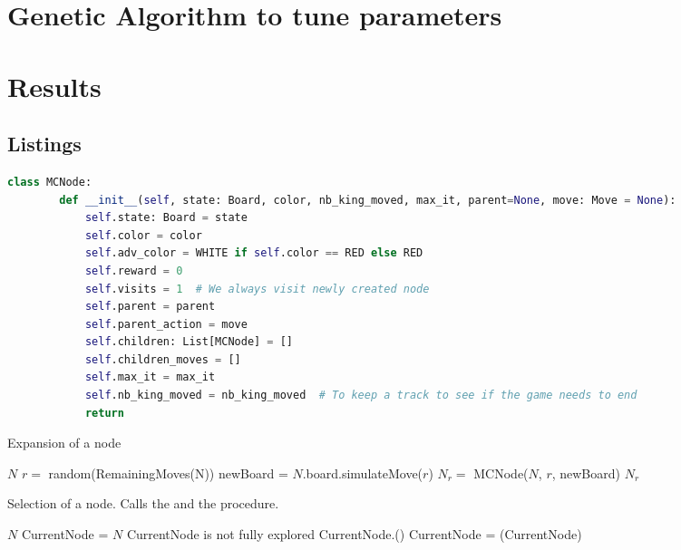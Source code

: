 \documentclass[11pt,a4paper]{article}
\begin{document}
\section{Genetic Algorithm to tune parameters}

\section{Results}

\begin{appendices}
\section{Listings}
\begin{lstlisting}[language=python, label=listing:constructor, caption={Constructor of a Monte-Carlo Tree-Search Node}]
    class MCNode:
        def __init__(self, state: Board, color, nb_king_moved, max_it, parent=None, move: Move = None):
            self.state: Board = state
            self.color = color
            self.adv_color = WHITE if self.color == RED else RED
            self.reward = 0
            self.visits = 1  # We always visit newly created node
            self.parent = parent
            self.parent_action = move
            self.children: List[MCNode] = []
            self.children_moves = []
            self.max_it = max_it
            self.nb_king_moved = nb_king_moved  # To keep a track to see if the game needs to end
            return
    \end{lstlisting}

\begin{algorithm}
    \caption{Expansion of a node}\label{listing:expand}
    \begin{algorithmic}
    \State $N$
    \State $r = $ random(RemainingMoves(N))
    \State newBoard = $N$.board.simulateMove($r$)
    \State $N_r = $ MCNode($N$, $r$, newBoard)
    \State \Return $N_r$
    \EndProcedure
    \end{algorithmic}
\end{algorithm}

\begin{algorithm}
    \caption{Selection of a node. Calls the  and the  procedure.}\label{listing:selection}
    \begin{algorithmic}
    \State $N$
    \State CurrentNode = $N$ 
        \If 
            {CurrentNode is not fully explored} 
            \State \Return CurrentNode.()
        \Else 
            \State CurrentNode = (CurrentNode)
            \EndIf
    \EndWhile
    \EndProcedure
    \end{algorithmic}
    \end{algorithm}
\end{appendices}
\end{document}
